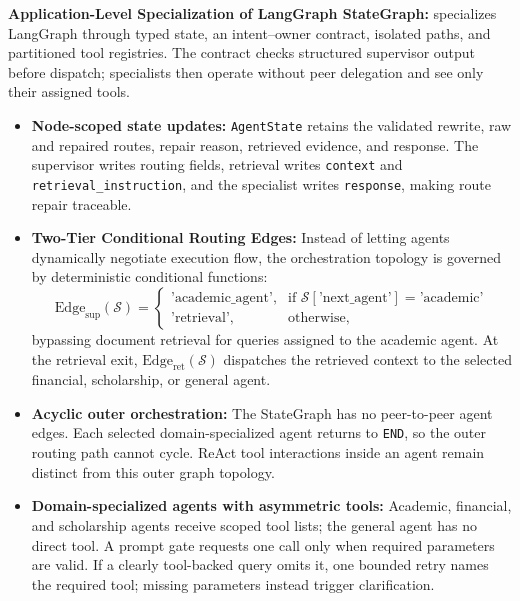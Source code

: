 \textbf{Application-Level Specialization of LangGraph StateGraph:}
\system{} specializes LangGraph through typed state, an intent--owner contract, isolated paths, and partitioned tool registries. The contract checks structured supervisor output before dispatch; specialists then operate without peer delegation and see only their assigned tools.
\begin{itemize}
    \setlength{\itemsep}{1.5pt}
    \setlength{\parsep}{0pt}
    \setlength{\parskip}{0pt}
    \item \textbf{Node-scoped state updates:} \texttt{AgentState} retains the validated rewrite, raw and repaired routes, repair reason, retrieved evidence, and response. The supervisor writes routing fields, retrieval writes \texttt{context} and \texttt{retrieval\_instruction}, and the specialist writes \texttt{response}, making route repair traceable.
    
    \item \textbf{Two-Tier Conditional Routing Edges:} Instead of letting agents dynamically negotiate execution flow, the orchestration topology is governed by deterministic conditional functions:
    \begin{equation}
        \mathrm{Edge}_{\text{sup}}(\mathcal{S}) = \begin{cases}
            \text{'academic\_agent'}, & \text{if } \mathcal{S}[\text{'next\_agent'}] = \text{'academic'} \\
            \text{'retrieval'}, & \text{otherwise},
        \end{cases}
    \end{equation}
    bypassing document retrieval for queries assigned to the academic agent. At the retrieval exit, $\mathrm{Edge}_{\text{ret}}(\mathcal{S})$ dispatches the retrieved context to the selected financial, scholarship, or general agent.
    
    \item \textbf{Acyclic outer orchestration:} The StateGraph has no peer-to-peer agent edges. Each selected domain-specialized agent returns to \texttt{END}, so the outer routing path cannot cycle. ReAct tool interactions inside an agent remain distinct from this outer graph topology.
    
    \item \textbf{Domain-specialized agents with asymmetric tools:} Academic, financial, and scholarship agents receive scoped tool lists; the general agent has no direct tool. A prompt gate requests one call only when required parameters are valid. If a clearly tool-backed query omits it, one bounded retry names the required tool; missing parameters instead trigger clarification.
\end{itemize}

